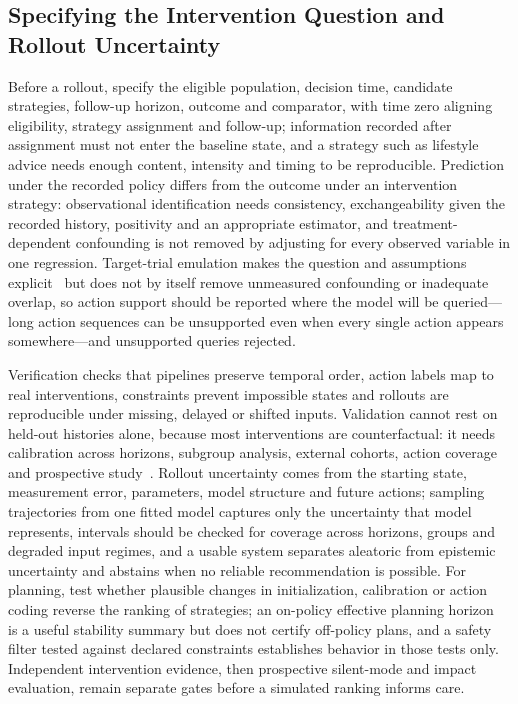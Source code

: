 \documentclass[journal]{IEEEtran}
\begin{document}
\subsection{Specifying the Intervention Question and Rollout Uncertainty}
\label{sec:interventionquestion}
\label{sec:rolloutuncertainty}
Before a rollout, specify the eligible population, decision time, candidate strategies, follow-up horizon, outcome and comparator, with time zero aligning eligibility, strategy assignment and follow-up; information recorded after assignment must not enter the baseline state, and a strategy such as lifestyle advice needs enough content, intensity and timing to be reproducible. Prediction under the recorded policy differs from the outcome under an intervention strategy: observational identification needs consistency, exchangeability given the recorded history, positivity and an appropriate estimator, and treatment-dependent confounding is not removed by adjusting for every observed variable in one regression. Target-trial emulation makes the question and assumptions explicit~\cite{hernan2016targettrial} but does not by itself remove unmeasured confounding or inadequate overlap, so action support should be reported where the model will be queried---long action sequences can be unsupported even when every single action appears somewhere---and unsupported queries rejected.

Verification checks that pipelines preserve temporal order, action labels map to real interventions, constraints prevent impossible states and rollouts are reproducible under missing, delayed or shifted inputs. Validation cannot rest on held-out histories alone, because most interventions are counterfactual: it needs calibration across horizons, subgroup analysis, external cohorts, action coverage and prospective study~\cite{Sel2025VVUQ}. Rollout uncertainty comes from the starting state, measurement error, parameters, model structure and future actions; sampling trajectories from one fitted model captures only the uncertainty that model represents, intervals should be checked for coverage across horizons, groups and degraded input regimes, and a usable system separates aleatoric from epistemic uncertainty and abstains when no reliable recommendation is possible. For planning, test whether plausible changes in initialization, calibration or action coding reverse the ranking of strategies; an on-policy effective planning horizon~\cite{wimalasiri2026verifiable} is a useful stability summary but does not certify off-policy plans, and a safety filter tested against declared constraints establishes behavior in those tests only. Independent intervention evidence, then prospective silent-mode and impact evaluation, remain separate gates before a simulated ranking informs care.
\end{document}
